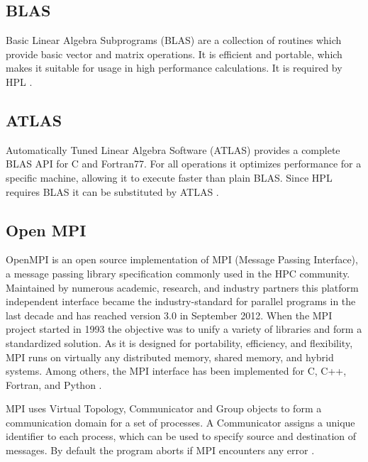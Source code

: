 \documentclass[10pt,twocolumn]{article}
\begin{document}
\subsection{BLAS}
Basic Linear Algebra Subprograms (BLAS) are a collection of routines which provide basic vector and matrix operations. It is efficient and portable, which makes it suitable for usage in high performance calculations. It is required by HPL \cite{blas}.

\subsection{ATLAS}
Automatically Tuned Linear Algebra Software (ATLAS) provides a complete BLAS API for C and Fortran77. For all operations it optimizes performance for a specific machine, allowing it to execute faster than plain BLAS. Since HPL requires BLAS it can be substituted by ATLAS \cite{atlas}.


\subsection{Open MPI}
OpenMPI is an open source implementation of MPI (Message Passing Interface), a message passing library specification commonly used in the HPC community. Maintained by numerous academic, research, and industry partners this platform independent interface became the industry-standard for parallel programs in the last decade and has reached version 3.0 in September 2012. When the MPI project started in 1993 the objective was to unify a variety of libraries and form a standardized solution. As it is designed for portability, efficiency, and flexibility, MPI runs on virtually any distributed memory, shared memory, and hybrid systems. Among others, the MPI interface has been implemented for C, C++, Fortran, and Python \cite{mpitut, ompi}.


MPI uses Virtual Topology, Communicator and Group objects to form a communication domain for a set of processes. A Communicator assigns a unique identifier to each process, which can be used  to specify source and destination of messages. By default the program aborts if MPI encounters any error \cite{ompi}.
\end{document}
